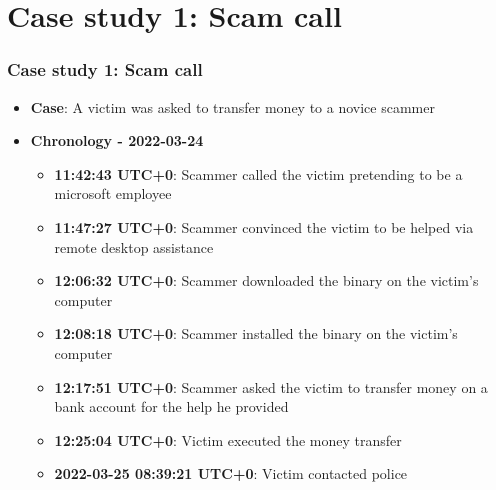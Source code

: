 \section{Case study 1: Scam call}
\begin{frame}
    \frametitle{Case study 1: Scam call}
    \begin{itemize}
        \item[] \textbf{Case}: A victim was asked to transfer money to a novice scammer
        \item[] \textbf{Chronology - 2022-03-24}
        \begin{itemize}
            \item[] \textbf{\small 11:42:43 UTC+0}: Scammer called the victim pretending to be a microsoft employee
            \item[] \textbf{\small 11:47:27 UTC+0}: Scammer convinced the victim to be helped via remote desktop assistance
            \item[] \textbf{\small 12:06:32 UTC+0}: Scammer downloaded the binary on the victim's computer
            \item[] \textbf{\small 12:08:18 UTC+0}: Scammer installed the binary on the victim's computer
            \item[] \textbf{\small 12:17:51 UTC+0}: Scammer asked the victim to transfer money on a bank account for the help he provided
            \item[] \textbf{\small 12:25:04 UTC+0}: Victim executed the money transfer
            \item[] \textbf{\small 2022-03-25 08:39:21 UTC+0}: Victim contacted police
        \end{itemize}
    \end{itemize}
\end{frame}

